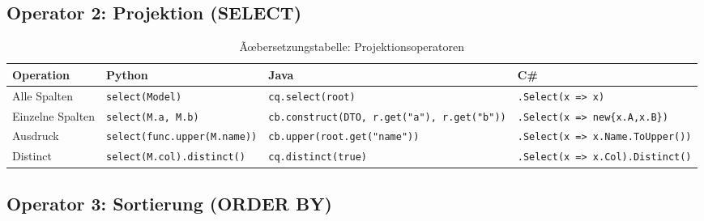 \subsection{Operator 2: Projektion (SELECT)}
\label{subsec:op_project}

\begin{table}
\centering
\caption{Ãœbersetzungstabelle: Projektionsoperatoren}
\label{tab:project_ops}
\renewcommand{\arraystretch}{1.4}
\begin{tabularx}{\textwidth}{lXXX}
\toprule
\textbf{Operation} & \textbf{Python} & \textbf{Java} & \textbf{C\#} \\
\midrule
Alle Spalten
  & \texttt{select(Model)}
  & \texttt{cq.select(root)}
  & \texttt{.Select(x => x)} \\
Einzelne Spalten
  & \texttt{select(M.a, M.b)}
  & \texttt{cb.construct(DTO, r.get("a"), r.get("b"))}
  & \texttt{.Select(x => new\{x.A,x.B\})} \\
Ausdruck
  & \texttt{select(func.upper(M.name))}
  & \texttt{cb.upper(root.get("name"))}
  & \texttt{.Select(x => x.Name.ToUpper())} \\
Distinct
  & \texttt{select(M.col).distinct()}
  & \texttt{cq.distinct(true)}
  & \texttt{.Select(x => x.Col).Distinct()} \\
\bottomrule
\end{tabularx}
\end{table}

\subsection{Operator 3: Sortierung (ORDER BY)}
\label{subsec:op_sort}

